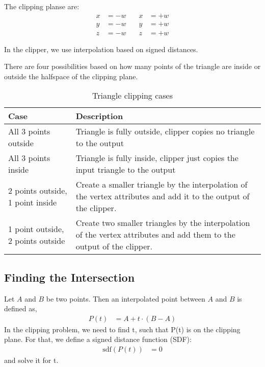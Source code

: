 The clipping planse are:
\begin{equation}
\begin{aligned}
x &= -w \quad & x &= +w \\
y &= -w \quad & y &= +w \\
z &= -w \quad & z &= +w
\end{aligned}
\label{eq:clipping_planes}
\end{equation}

In the clipper, we use interpolation based on signed distances.

There are four possibilities based on how many points of the triangle are inside or outside the halfspace of the clipping plane.


\begin{table}[h!]
\centering
\begin{tabular}{|l|p{10cm}|}
\hline
\textbf{Case} & \textbf{Description} \\
\hline
All 3 points outside & Triangle is fully outside, clipper copies no triangle to the output \\
\hline
All 3 points inside & Triangle is fully inside, clipper just copies the input triangle to the output \\
\hline
2 points outside, 1 point inside & Create a smaller triangle by the interpolation of the vertex attributes and add it to the output of the clipper. \\
\hline
1 point outside, 2 points outside & Create two smaller triangles by the interpolation of the vertex attributes and add them to the output of the clipper. \\
\hline
\end{tabular}
\caption{Triangle clipping cases}
\end{table}

\subsection{Finding the Intersection}
Let $A$ and $B$ be two points.
Then an interpolated point between $A$ and $B$ is defined as,
\begin{align*}
P(t) &= A + t \cdot (B - A)
\end{align*}
In the clipping problem, we need to find t, such that P(t) is on the clipping plane.
For that, we define a signed distance function (SDF):
\begin{align*}
\text{sdf}(P(t)) &= 0
\end{align*}
and solve it for t.

